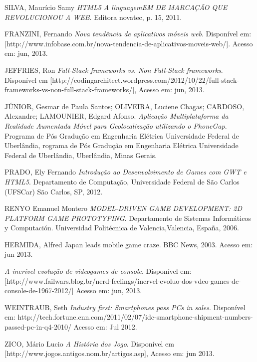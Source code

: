 \documentclass{article}
\begin{document}
\begin{thebibliography}{99}
        SILVA, Maurício Samy
        \emph{HTML5 A linguagemEM DE MARCAÇÃO QUE REVOLUCIONOU A WEB}. 
        Editora novatec, p. 15, 2011.

        FRANZINI, Fernando 
        \emph{Nova tendência de aplicativos móveis web}.  Disponível em:
        [http://www.infobase.com.br/nova-tendencia-de-aplicativos-moveis-web/]. Acesso em: jun,
        2013.

        JEFFRIES, Ron 
        \emph{Full-Stack frameworks vs. Non Full-Stack frameworks}.
        Disponível em [http://codingarchitect.wordpress.com/2012/10/22/full-stack-frameworks-vs-non-full-stack-frameworks/], Acesso em: jun, 2013.


        JÚNIOR, Gesmar de Paula Santos; OLIVEIRA, Luciene Chagas; CARDOSO, Alexandre; LAMOUNIER, Edgard Afonso.
        \emph{Aplicação Multiplataforma da Realidade Aumentada Móvel para Geolocalização utilizando o PhoneGap}.
        Programa de Pós Gradução em Engenharia Elétrica
        Universidade Federal de Uberlândia, rograma de Pós Gradução em Engenharia Elétrica
        Universidade Federal de Uberlândia, Uberlândia, Minas Gerais.



        PRADO, Ely Fernando
        \emph{Introdução ao Desenvolvimento de Games com GWT e HTML5}. 
        Departamento de Computação, Universidade Federal de São Carlos (UFSCar) São Carlos, SP, 2012.


        RENYO Emanuel Montero 
        \emph{MODEL-DRIVEN GAME DEVELOPMENT: 2D PLATFORM GAME PROTOTYPING}. 
        Departamento de Sistemas Informáticos y Computación. Universidad Politécnica de Valencia,Valencia, España, 2006.



        HERMIDA, Alfred 
        Japan leads mobile game craze. BBC News, 2003. Acesso em: jun 2013.

        \emph{A incrível evolução de videogames de console}. 
        Disponível em: [http://www.failwars.blog.br/nerd-feelings/incrvel-evoluo-dos-vdeo-games-de-console-de-1967-2012/] Acesso em: jun, 2013.

        WEINTRAUB, Seth
        \emph{Industry first: Smartphones pass PCs in sales}.
        Disponível em: http://tech.fortune.cnn.com/2011/02/07/idc-smartphone-shipment-numbers-passed-pc-in-q4-2010/
        Acesso em: Jul 2012.

        ZICO, Mário Lucio 
        \emph{A História dos Jogo}. 
        Disponível em [http://www.jogos.antigos.nom.br/artigos.asp], Acesso em: jun 2013.



\end{thebibliography}

\printindex[not]

\printindex[list]

\printindex
\end{document}
